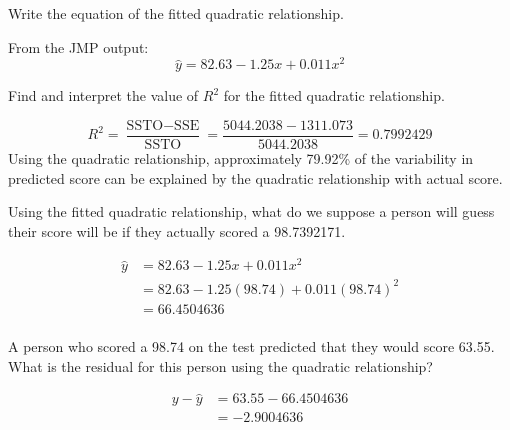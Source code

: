 \documentclass{examsetup}\usepackage[]{graphicx}\usepackage[]{color}
\begin{document}
\begin{questions}
\begin{parts}
   \begin{subparts}
      \subpart[5] Write the equation of the fitted quadratic relationship. 
      \begin{solution}
         From the JMP output: \\

         $$\hat{y} = 82.63 - 1.25 x + 0.011 x^2$$
      \end{solution} 
      \subpart[5] Find and interpret the value of $R^2$ for the fitted quadratic relationship.
      \begin{solution}
         $$
         R^2 = \frac{\text{SSTO} - \text{SSE}}{\text{SSTO}} = \frac{5044.2038 - 1311.073}{5044.2038} = 0.7992429
         $$
         Using the quadratic relationship, approximately 79.92\% of the variability in predicted score can be explained by the quadratic relationship with actual score.
      \end{solution}
      \subpart[5] Using the fitted quadratic relationship, what do we suppose a person will guess their score will be if they actually scored a 98.7392171.
      \begin{solution}
         \begin{align*}
         \hat{y} &= 82.63 - 1.25 x + 0.011 x^2 \\
                 &= 82.63 - 1.25 (98.74) + 0.011 (98.74)^2 \\
                 &= 66.4504636 \\
         \end{align*}
      \end{solution}
      \subpart[2] A person who scored a 98.74 on the test predicted that they would score 63.55. What is the residual for this person using the quadratic relationship?
      \begin{solution}
         \begin{align*}
            y - \hat{y}  &= 63.55 - 66.4504636 \\
                         &= \ensuremath{-2.9004636} \\
         \end{align*}
      \end{solution}
      \vspace{2cm}
      \vspace{2cm}
   \end{subparts}
\end{parts}

\end{questions}
\end{document}
